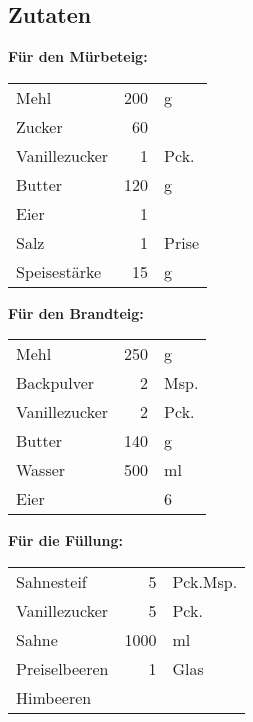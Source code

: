 \subsection*{Zutaten}
\textbf{Für den Mürbeteig:}\\
\begin{tabular}{lrl}
	Mehl          & 200 &     g \\
	Zucker        &  60 &  \\
	Vanillezucker &   1 &  Pck. \\
	Butter        & 120 &     g \\
	Eier          &   1 &  \\
	Salz          &   1 & Prise \\
	Speisestärke  &  15 &     g
\end{tabular} 

\textbf{Für den Brandteig:}\\
\begin{tabular}{lrl}
	Mehl          & 250 &         g   \\
	Backpulver    &   2 &      Msp.   \\
	Vanillezucker &   2 &      Pck.   \\
	Butter        & 140 &         g   \\
	Wasser        & 500 & ml\\
	Eier &  & 6
\end{tabular} 

\textbf{Für die Füllung:}\\
\begin{tabular}{lrl}
	Sahnesteif    &    5 & Pck.Msp. \\
	Vanillezucker &    5 &     Pck. \\
	Sahne         & 1000 &       ml \\
	Preiselbeeren &    1 &     Glas \\
	Himbeeren     &      &
\end{tabular} 


